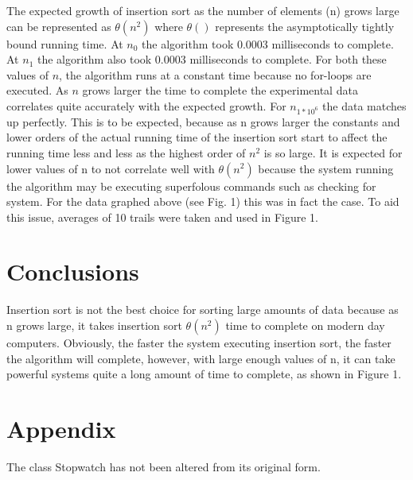 \documentclass[onecolumn, 12pt, article]{IEEEtran}
\numberwithin{case}{problem}
\numberwithin{condition}{problem}
\numberwithin{condition}{subsection}
\numberwithin{definition}{section}
\theoremstyle{remark}
\numberwithin{question}{problem}
\theoremstyle{plain}
\numberwithin{answer}{problem}
\numberwithin{solution}{section}
\numberwithin{equation}{section}%
\begin{document}
The expected growth of insertion sort as the number of elements (n) grows large can be represented as $ \theta(n^2) $ where $ \theta() $ represents the asymptotically tightly bound running time. \cite{textbook} At $n_0$ the algorithm took 0.0003 milliseconds to complete. At $n_1$ the algorithm also took 0.0003 milliseconds to complete. For both these values of $n$, the algorithm runs at a constant time because no for-loops are executed. As $n$ grows larger the time to complete the experimental data correlates quite accurately with the expected growth. For $n_{1*10^6} $ the data matches up perfectly. This is to be expected, because as n grows larger the constants and lower orders of the actual running time of the insertion sort start to affect the running time less and less as the highest order of $n^2$ is so large. It is expected for lower values of n to not correlate well with $ \theta(n^2) $ because the system running the algorithm may be executing superfolous commands such as checking for system. For the data graphed above (see Fig. 1) this was in fact the case. To aid this issue, averages of 10 trails were taken and used in Figure 1.

\section{Conclusions}
Insertion sort is not the best choice for sorting large amounts of data because as n grows large, it takes insertion sort $ \theta(n^2) $ time to complete on modern day computers. Obviously, the faster the system executing insertion sort, the faster the algorithm will complete, however, with large enough values of n, it can take powerful systems quite a long amount of time to complete, as shown in Figure 1. 

\newpage


\nocite{*}




\newpage

\section*{Appendix}




The class Stopwatch has not been altered from its original form.
\newline



\end{document}
